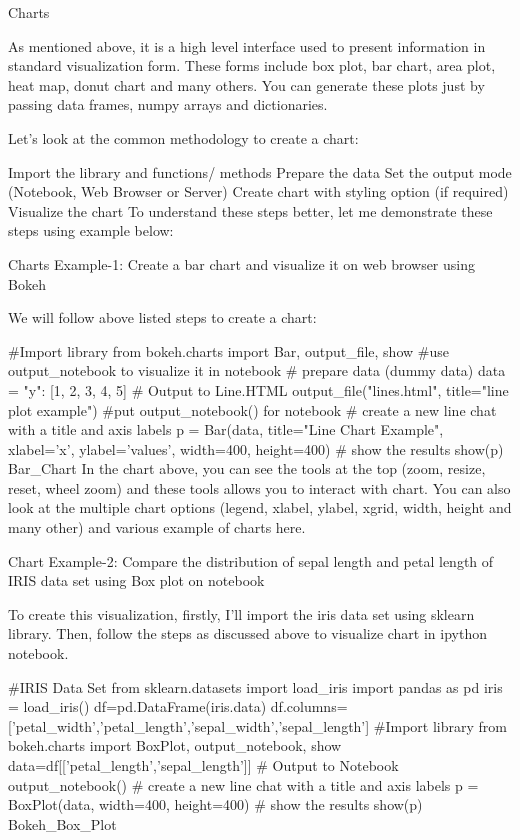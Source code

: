 Charts

As mentioned above, it is a high level interface used to present information in standard visualization form. 
These forms include box plot, bar chart, area plot, heat map, donut chart and many others. You can generate these plots just by passing data frames, numpy arrays and dictionaries.

Let’s look at the common methodology to create a chart:

Import the library and functions/ methods
Prepare the data
Set the output mode (Notebook, Web Browser or Server)
Create chart with styling option (if required)
Visualize the chart
To understand these steps better, let me demonstrate these steps using example below:

Charts Example-1: Create a bar chart and visualize it on web browser using Bokeh

We will follow above listed steps to create a chart:

#Import library
from bokeh.charts import Bar, output_file, show #use output_notebook to visualize it in notebook
# prepare data (dummy data)
data = {"y": [1, 2, 3, 4, 5]}
# Output to Line.HTML
output_file("lines.html", title="line plot example") #put output_notebook() for notebook
# create a new line chat with a title and axis labels
p = Bar(data, title="Line Chart Example", xlabel='x', ylabel='values', width=400, height=400)
# show the results
show(p)
Bar_Chart
In the chart above,  you can see the tools at the top (zoom, resize, reset, wheel zoom) and these 
tools allows you to interact with chart. 
You can also look at the multiple chart options (legend, xlabel, ylabel, xgrid, width, height and many other) and 
various example of charts here.



Chart Example-2: Compare the distribution of sepal length and petal length of IRIS data set using 
Box plot on notebook

To create this visualization, firstly, I’ll import the iris data set using sklearn library. Then, 
follow the steps as discussed above to visualize chart in ipython notebook.

#IRIS Data Set
from sklearn.datasets import load_iris
import pandas as pd
iris = load_iris()
df=pd.DataFrame(iris.data)
df.columns=['petal_width','petal_length','sepal_width','sepal_length']
#Import library
from bokeh.charts import BoxPlot, output_notebook, show
data=df[['petal_length','sepal_length']]
# Output to Notebook
output_notebook()
# create a new line chat with a title and axis labels
p = BoxPlot(data, width=400, height=400)
# show the results
show(p)
Bokeh_Box_Plot

